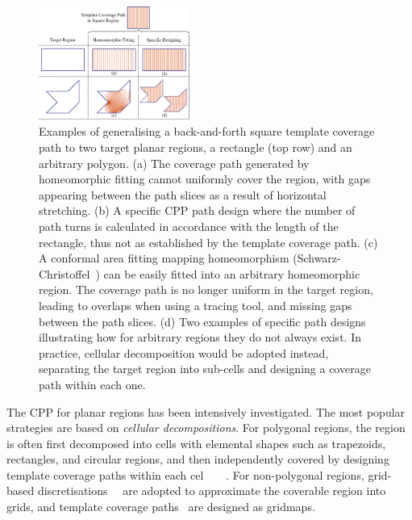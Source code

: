 \documentclass[lettersize,journal]{IEEEtran}
\begin{document}
\begin{figure}[t]
\centering
\includegraphics[width=0.44\textwidth]{figures/fig1/fig1_thick}
\caption{Examples of generalising a back-and-forth square template coverage path to two target planar regions, a rectangle (top row) and an arbitrary polygon.
(a) The coverage path generated by homeomorphic fitting cannot uniformly cover the region, with gaps appearing between the path slices as a result of horizontal stretching.  
(b) A specific CPP path design where the number of path turns is calculated in accordance with the length of the rectangle, thus not as established by the template coverage path. 
(c) A conformal area fitting mapping homeomorphism (Schwarz-Christoffel~\cite{Driscoll2002Schwarz}) can be easily fitted into an arbitrary homeomorphic region.
The coverage path is no longer uniform in the target region, leading to overlaps when using a tracing tool, and missing gaps between the path slices. 
(d) Two examples of specific path designs illustrating how for arbitrary regions they do not always exist. In practice, cellular decomposition would be adopted instead, separating the target region into sub-cells and designing a coverage path within each one.
}\label{fig:planar_deformation}
\end{figure}


The CPP for planar regions has been intensively investigated. 
The most popular strategies are based on \textit{cellular decompositions}. 
For polygonal regions, the region is often first decomposed into cells with elemental shapes such as trapezoids, rectangles, and circular regions, and then independently
covered by designing template coverage paths within each cel~\cite{Choset2000Coverage}~\cite{Latombe2012Robot}~\cite{Sadat2015Fractal}~\cite{Hassan2018A}.
For non-polygonal regions, grid-based discretisations~\cite{Gabriely2002Spiral}~\cite{Cabreira2019Grid} are adopted to approximate the coverable region into grids, and template coverage paths~\cite{Choi2009Online} are designed as gridmaps. 
\end{document}
